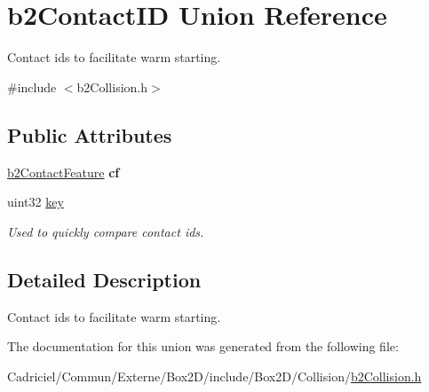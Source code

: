 \hypertarget{unionb2_contact_i_d}{}\section{b2\+Contact\+ID Union Reference}
\label{unionb2_contact_i_d}


Contact ids to facilitate warm starting.  




{\ttfamily \#include $<$b2\+Collision.\+h$>$}

\subsection*{Public Attributes}
\begin{DoxyCompactItemize}
\item 
\hyperlink{structb2_contact_feature}{b2\+Contact\+Feature} {\bfseries cf}\hypertarget{unionb2_contact_i_d_a58b6732f909bc760f75e7aff3cd4be08}{}\label{unionb2_contact_i_d_a58b6732f909bc760f75e7aff3cd4be08}

\item 
uint32 \hyperlink{unionb2_contact_i_d_a04c04f8fdcb799b33552d01b3aa3f245}{key}\hypertarget{unionb2_contact_i_d_a04c04f8fdcb799b33552d01b3aa3f245}{}\label{unionb2_contact_i_d_a04c04f8fdcb799b33552d01b3aa3f245}

\begin{DoxyCompactList}\small\item\em Used to quickly compare contact ids. \end{DoxyCompactList}\end{DoxyCompactItemize}


\subsection{Detailed Description}
Contact ids to facilitate warm starting. 

The documentation for this union was generated from the following file\+:\begin{DoxyCompactItemize}
\item 
Cadriciel/\+Commun/\+Externe/\+Box2\+D/include/\+Box2\+D/\+Collision/\hyperlink{b2_collision_8h}{b2\+Collision.\+h}\end{DoxyCompactItemize}
